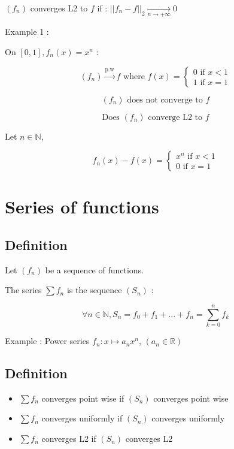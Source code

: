 \documentclass[a4paper,12pt]{article}
\begin{document}
$(f_n)$ converges L2 to $f$ if : $||f_n - f||_2 \underset{n \rightarrow +\infty}{\rightarrow} 0$ \newline

Example 1 : \newline

On $[0, 1], f_n(x) = x^n$ : \newline

\[(f_n) \overset{\text{p.w}}{\rightarrow} f \text{ where }  f(x) = \begin{cases}
    0 \text{ if } x < 1 \\
    1 \text{ if } x = 1
\end{cases}\] 

\[
(f_n) \text{ does not converge to } f
\]

\[\text{Does } (f_n) \text{ converge L2 to } f \]

Let $n \in \mathbb{N}$, 

\[
f_n(x) - f(x) = \begin{cases}
    x^n \text{ if } x < 1  \\
    0 \text{ if } x = 1
\end{cases}
\]

\section{Series of functions}

\subsection{Definition}

Let $(f_n)$ be a sequence of functions. \newline

The series $\sum{f_n}$ is the sequence $(S_n)$ :

\[
\forall n \in \mathbb{N}, S_n = f_0 + f_1 + ... + f_n = \sum_{k = 0}^{n}{f_k}
\]

Example : Power series $f_n : x \mapsto a_nx^n$, $(a_n \in \mathbb{R})$ \newline

\subsection{Definition}

\begin{itemize}
    \item $\sum{f_n}$ converges point wise if $(S_n)$ converges point wise
    \item $\sum{f_n}$ converges uniformly if $(S_n)$ converges uniformly
    \item $\sum{f_n}$ converges L2 if $(S_n)$ converges L2
\end{itemize}
\end{document}
